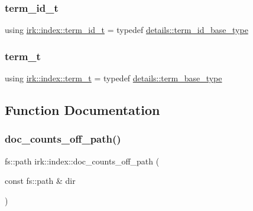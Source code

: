 \mbox{\label{namespaceirk_1_1index_ae2ce3a02969196fe6dab4443ed2007d5}} 
\subsubsection{\texorpdfstring{term\+\_\+id\+\_\+t}{term\_id\_t}}
{\footnotesize\ttfamily using \mbox{\hyperlink{namespaceirk_1_1index_ae2ce3a02969196fe6dab4443ed2007d5}{irk\+::index\+::term\+\_\+id\+\_\+t}} = typedef \mbox{\hyperlink{namespaceirk_1_1index_1_1details_a03b015c00fec26f2586208453b6e99ba}{details\+::term\+\_\+id\+\_\+base\+\_\+type}}}

\mbox{\label{namespaceirk_1_1index_a7c2517c1f98e5b5f30ba3ab2f837caf6}} 
\subsubsection{\texorpdfstring{term\+\_\+t}{term\_t}}
{\footnotesize\ttfamily using \mbox{\hyperlink{namespaceirk_1_1index_a7c2517c1f98e5b5f30ba3ab2f837caf6}{irk\+::index\+::term\+\_\+t}} = typedef \mbox{\hyperlink{namespaceirk_1_1index_1_1details_ae85cb57d6db703cac1c9eb5af11a03f2}{details\+::term\+\_\+base\+\_\+type}}}



\subsection{Function Documentation}
\mbox{\label{namespaceirk_1_1index_a038babf1f6aece61737ccb3c5984d75e}} 
\subsubsection{\texorpdfstring{doc\+\_\+counts\+\_\+off\+\_\+path()}{doc\_counts\_off\_path()}}
{\footnotesize\ttfamily fs\+::path irk\+::index\+::doc\+\_\+counts\+\_\+off\+\_\+path (\begin{DoxyParamCaption}\item[{const fs\+::path \&}]{dir }\end{DoxyParamCaption})\hspace{0.3cm}{\ttfamily [inline]}}

